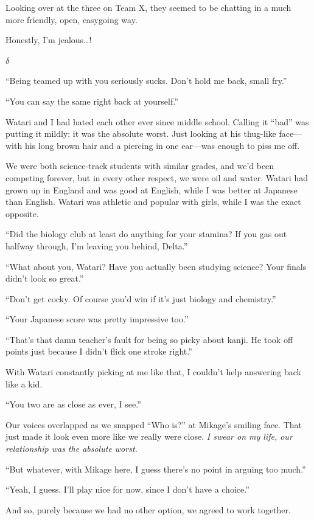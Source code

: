 \documentclass[
    a4paper,
    12pt,
    twoside,
    openany,
    UTF8,
    fontset=windows
]{ctexbook}
\begin{document}
Looking over at the three on Team X, they seemed to be chatting in a much more friendly, open, easygoing way.

Honestly, I'm jealous\dots!

$\delta$

``Being teamed up with you seriously sucks. Don't hold me back, small fry.''

``You can say the same right back at yourself.''

Watari and I had hated each other ever since middle school. Calling it ``bad'' was putting it mildly; it was the absolute worst. Just looking at his thug-like face---with his long brown hair and a piercing in one ear---was enough to piss me off.

We were both science-track students with similar grades, and we'd been competing forever, but in every other respect, we were oil and water. Watari had grown up in England and was good at English, while I was better at Japanese than English. Watari was athletic and popular with girls, while I was the exact opposite.

``Did the biology club at least do anything for your stamina? If you gas out halfway through, I'm leaving you behind, Delta.''

``What about you, Watari? Have you actually been studying science? Your finals didn't look so great.''

``Don't get cocky. Of course you'd win if it's just biology and chemistry.''

``Your Japanese score was pretty impressive too.''

``That's that damn teacher's fault for being so picky about kanji. He took off points just because I didn't flick one stroke right.''

With Watari constantly picking at me like that, I couldn't help answering back like a kid.

``You two are as close as ever, I see.''

Our voices overlapped as we snapped ``Who is?'' at Mikage's smiling face. That just made it look even more like we really were close. \textit{I swear on my life, our relationship was the absolute worst.}

``But whatever, with Mikage here, I guess there's no point in arguing too much.''

``Yeah, I guess. I'll play nice for now, since I don't have a choice.''

And so, purely because we had no other option, we agreed to work together.
\end{document}
